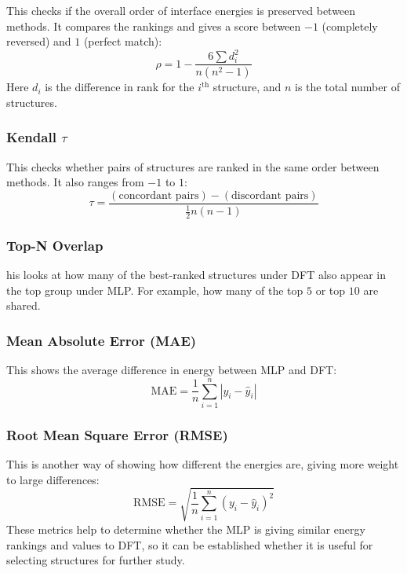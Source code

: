 This checks if the overall order of interface energies is preserved between methods.
It compares the rankings and gives a score between $-1$ (completely reversed) and $1$ (perfect match):
\begin{equation}
    \rho = 1 - \frac{6 \sum d_i^2}{n(n^2 - 1)}
\end{equation}
Here $d_i$ is the difference in rank for the $i^\text{th}$ structure, and $n$ is the total number of structures.

\subsubsection*{Kendall $\tau$}
This checks whether pairs of structures are ranked in the same order between methods.
It also ranges from $-1$ to $1$:
\begin{equation}
    \tau = \frac{(\text{concordant pairs}) - (\text{discordant pairs})}{\frac{1}{2}n(n-1)}
\end{equation}

\subsubsection*{Top-N Overlap} his looks at how many of the best-ranked structures under DFT also appear in the top group under MLP. For example, how many of the top $5$ or top $10$ are shared.

\subsubsection*{Mean Absolute Error (MAE)} This shows the average difference in energy between MLP and DFT:
\begin{equation}
    \text{MAE} = \frac{1}{n} \sum_{i=1}^{n} |y_i - \hat{y}_i|
\end{equation}

\subsubsection*{Root Mean Square Error (RMSE)} This is another way of showing how different the energies are, giving more weight to large differences:
\begin{equation}
    \text{RMSE} = \sqrt{\frac{1}{n} \sum_{i=1}^{n} (y_i - \hat{y}_i)^2}
\end{equation}
These metrics help to determine whether the MLP is giving similar energy rankings and values to DFT, so it can be established whether it is useful for selecting structures for further study\nocite{}.

